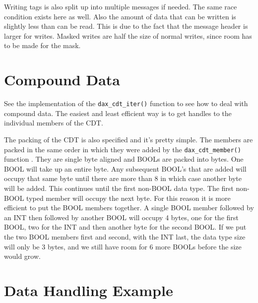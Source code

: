 Writing tags is also split up into multiple messages if needed.  The same
race condition exists here as well.  Also the amount of data that can be
written is slightly less than can be read.  This is due to the fact that
the message header is larger for writes.
Masked writes are half the size of normal writes, since room has to be made
for the mask.

\section{Compound Data}

See the implementation of the \verb|dax_cdt_iter()| function  to see how to deal with compound data.  The easiest and least efficient way is to get handles to the individual members of the CDT.

The packing of the CDT is also specified and it's pretty simple.  The members
are packed in the same order in which they were added by the
\verb|dax_cdt_member()| function .  They
are single byte aligned and BOOLs are packed into bytes.  One BOOL will take
up an entire byte.  Any subsequent BOOL's that are added will occupy that
same byte until there are more than 8 in which case another byte will be
added.  This continues until the first non-BOOL data type.  The first
non-BOOL typed member will occupy the next byte.  For this reason it is more
efficient to put the BOOL members together.  A single BOOL member followed by
an INT then followed by another BOOL will occupy 4 bytes, one for the first
BOOL, two for the INT and then another byte for the second BOOL.  If we put
the two BOOL members first and second, with the INT last, the data type size
will only be 3 bytes, and we still have room for 6 more BOOLs before the size
would grow.

\section{Data Handling Example}
